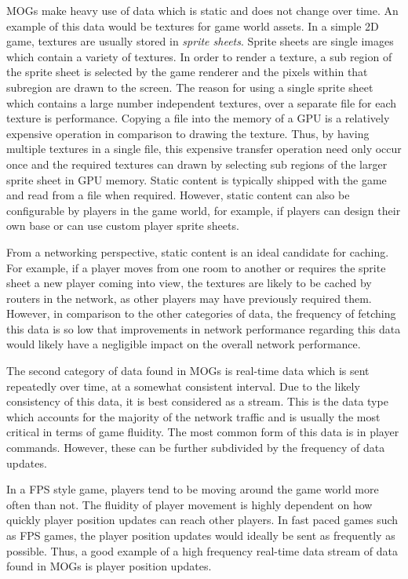 MOGs make heavy use of data which is static and does not change over time. An example of this data would be textures for game world assets. In a simple 2D game, textures are usually stored in \textit{sprite sheets}. Sprite sheets are single images which contain a variety of textures. In order to render a texture, a sub region of the sprite sheet is selected by the game renderer and the pixels within that subregion are drawn to the screen. The reason for using a single sprite sheet which contains a large number independent textures, over a separate file for each texture is performance. Copying a file into the memory of a GPU is a relatively expensive operation in comparison to drawing the texture. Thus, by having multiple textures in a single file, this expensive transfer operation need only occur once and the required textures can drawn by selecting sub regions of the larger sprite sheet in GPU memory. Static content is typically shipped with the game and read from a file when required. However, static content can also be configurable by players in the game world, for example, if players can design their own base or can use custom player sprite sheets.  

From a networking perspective, static content is an ideal candidate for caching. For example, if a player moves from one room to another or requires the sprite sheet a new player coming into view, the textures are likely to be cached by routers in the network, as other players may have previously required them. However, in comparison to the other categories of data, the frequency of fetching this data is so low that improvements in network performance regarding this data would likely have a negligible impact on the overall network performance.

The second category of data found in MOGs is real-time data which is sent repeatedly over time, at a somewhat consistent interval. Due to the likely consistency of this data, it is best considered as a stream. This is the data type which accounts for the majority of the network traffic and is usually the most critical in terms of game fluidity. The most common form of this data is in player commands. However, these can be further subdivided by the frequency of data updates. 

In a FPS style game, players tend to be moving around the game world more often than not. The fluidity of player movement is highly dependent on how quickly player position updates can reach other players. In fast paced games such as FPS games, the player position updates would ideally be sent as frequently as possible. Thus, a good example of a high frequency real-time data stream of data found in MOGs is player position updates.

